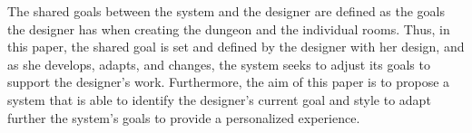 The shared goals between the system and the designer are defined as the goals the designer has when creating the dungeon and the individual rooms. Thus, in this paper, the shared goal is set and defined by the designer with her design, and as she develops, adapts, and changes, the system seeks to adjust its goals to support the designer's work. Furthermore, the aim of this paper is to propose a system that is able to identify the designer's current goal and style to adapt further the system's goals to provide a personalized experience.


